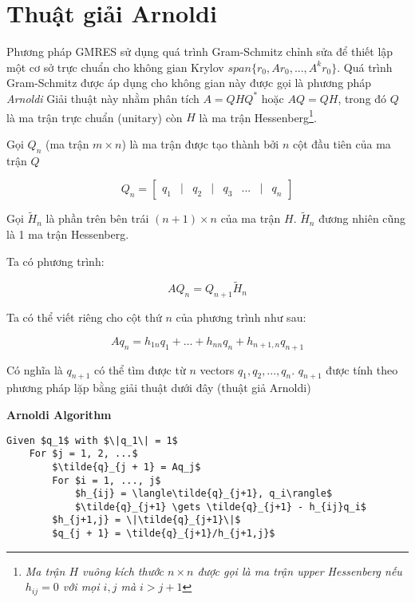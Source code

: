 \section{Thuật giải Arnoldi}
Phương pháp GMRES sử dụng quá trình Gram-Schmitz chỉnh sửa để thiết lập
một cơ sở trực chuẩn cho không gian Krylov $span\{r_0, Ar_0, ..., A^kr_0 \}$.
Quá trình Gram-Schmitz được áp dụng cho không gian này được gọi là phương pháp \textit{Arnoldi}
Giải thuật này nhằm phân tích $A=QHQ^*$ hoặc $AQ = QH$, trong đó $Q$ là ma trận trực chuẩn (unitary) 
còn $H$ là ma trận Hessenberg\footnote{
    \textit{
    Ma trận $H$ vuông kích thước $n \times n$ được gọi là ma trận upper Hessenberg nếu
    $h_{ij} = 0$ với mọi $i,j$ mà $i > j + 1$
}
}.

Gọi $Q_n$ (ma trận $m \times n$) là ma trận được tạo thành bởi $n$ cột đầu tiên của ma trận $Q$

\begin{equation}
    Q_n = \begin{bmatrix}
        q_1 & | & q_2 & | & q_3 & ... & | & q_n
    \end{bmatrix}    
\end{equation}

Gọi $\tilde{H}_n$ là phần trên bên trái $(n + 1) \times n$ của ma trận $H$.
$\tilde{H}_n$ đương nhiên cũng là 1 ma trận Hessenberg. 

Ta có phương trình:

\begin{equation}
    AQ_n = Q_{n + 1}\tilde{H}_n \label{arnoldi:1}
\end{equation}

Ta có thể viết riêng cho cột thứ $n$ của phương trình như sau:

\begin{equation}
    Aq_n = h_{1n}q_1 + ... + h_{nn}q_n + h_{n+1,n}q_{n + 1}
\end{equation}

Có nghĩa là $q_{n+1}$ có thể tìm được từ $n$ vectors $q_1, q_2, ..., q_n$. 
$q_{n+1}$ được tính theo phương pháp lặp bằng giải thuật dưới đây (thuật giả Arnoldi)


\textbf{Arnoldi Algorithm}
\begin{lstlisting}[style=algo]
    Given $q_1$ with $\|q_1\| = 1$
    For $j = 1, 2, ...$
        $\tilde{q}_{j + 1} = Aq_j$
        For $i = 1, ..., j$
            $h_{ij} = \langle\tilde{q}_{j+1}, q_i\rangle$
            $\tilde{q}_{j+1} \gets \tilde{q}_{j+1} - h_{ij}q_i$
        $h_{j+1,j} = \|\tilde{q}_{j+1}\|$
        $q_{j + 1} = \tilde{q}_{j+1}/h_{j+1,j}$
\end{lstlisting}

